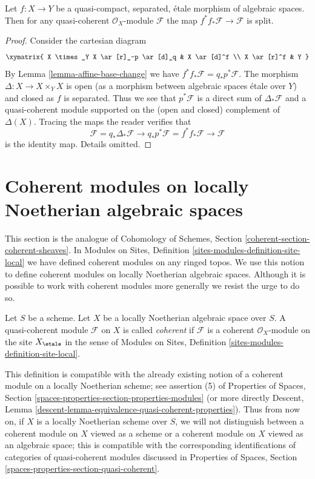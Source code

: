 \begin{lemma}
\label{lemma-etale-pull-push-split}
Let $f : X \to Y$ be a quasi-compact, separated, \'etale morphism
of algebraic spaces. Then for any quasi-coherent $\mathcal{O}_X$-module
$\mathcal{F}$ the map $f^*f_*\mathcal{F} \to \mathcal{F}$ is split.
\end{lemma}

\begin{proof}
Consider the cartesian diagram
$$
\xymatrix{
X \times_Y X \ar[r]_-p \ar[d]_q & X \ar[d]^f \\
X \ar[r]^f & Y
}
$$
By Lemma \ref{lemma-affine-base-change} we have
$f^*f_*\mathcal{F} = q_*p^*\mathcal{F}$. The morphism
$\Delta : X \to X \times_Y X$ is open (as a morphism between
algebraic spaces \'etale over $Y$) and closed as $f$ is separated.
Thus we see that $p^*\mathcal{F}$ is a direct sum of
$\Delta_*\mathcal{F}$ and a quasi-coherent module supported
on the (open and closed) complement of $\Delta(X)$.
Tracing the maps the reader verifies that
$$
\mathcal{F} = q_*\Delta_*\mathcal{F} \to
q_*p^*\mathcal{F} = f^*f_*\mathcal{F} \to
\mathcal{F}
$$
is the identity map. Details omitted.
\end{proof}



\section{Coherent modules on locally Noetherian algebraic spaces}
\label{section-coherent}

\noindent
This section is the analogue of
Cohomology of Schemes, Section \ref{coherent-section-coherent-sheaves}.
In Modules on Sites, Definition \ref{sites-modules-definition-site-local}
we have defined coherent modules on any ringed topos. We use this notion
to define coherent modules on locally Noetherian algebraic spaces.
Although it is possible to work with coherent modules more generally
we resist the urge to do so.

\begin{definition}
\label{definition-coherent}
Let $S$ be a scheme. Let $X$ be a locally Noetherian algebraic space over $S$.
A quasi-coherent module $\mathcal{F}$ on $X$ is called {\it coherent}
if $\mathcal{F}$ is a coherent $\mathcal{O}_X$-module on the site
$X_\etale$ in the sense of
Modules on Sites, Definition \ref{sites-modules-definition-site-local}.
\end{definition}

\noindent
This definition is compatible with the already existing notion of a
coherent module on a locally Noetherian scheme; see assertion (5) of
Properties of Spaces, Section
\ref{spaces-properties-section-properties-modules} (or more directly
Descent, Lemma \ref{descent-lemma-equivalence-quasi-coherent-properties}).
Thus from now on, if $X$ is a locally Noetherian scheme over $S$,
we will not distinguish between a coherent module on $X$ viewed
as a scheme or a coherent module on $X$ viewed as an algebraic space;
this is compatible with the corresponding identifications of categories
of quasi-coherent modules discussed in
Properties of Spaces, Section \ref{spaces-properties-section-quasi-coherent}.

